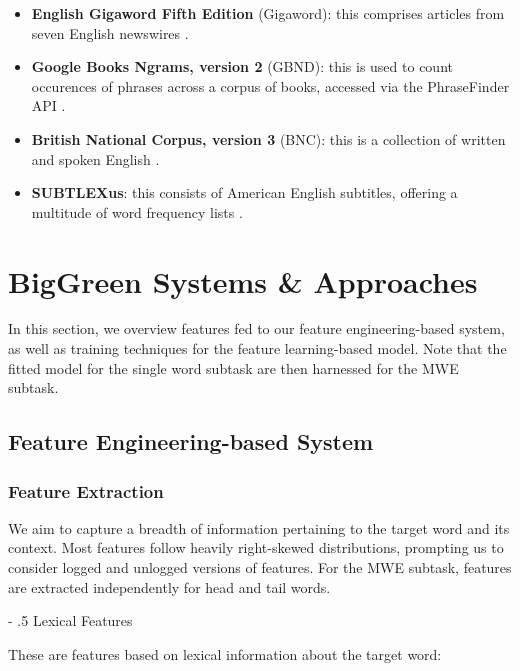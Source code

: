 \documentclass[11pt,a4paper]{article}
\makeatletter
\renewcommand\paragraph{%
    \@startsection{paragraph}{4}{0mm}%
        {-\baselineskip}%
        {.5\baselineskip}%
        {\normalfont\normalsize\bfseries}}
\makeatother
\begin{document}
\begin{itemize}
  \item \noindent \textbf{English Gigaword Fifth Edition} (Gigaword): this comprises articles from seven English newswires \citep{gigaword}.
  \item \noindent \textbf{Google Books Ngrams, version 2} (GBND): this is used to count occurences of phrases across a corpus of books, accessed via the PhraseFinder API \citep{phrasefinder}.
  \item \noindent \textbf{British National Corpus, version 3} (BNC): this is a collection of written and spoken English \citep{BNC}.
  \item \noindent \textbf{SUBTLEXus}: this consists of American English subtitles, offering a multitude of word frequency lists \citep{Brysbaert2009MovingBK}.
\end{itemize}

\section{BigGreen Systems \& Approaches}

In this section, we overview features fed to our feature engineering-based system, as well as training techniques for the feature learning-based model. Note that the fitted model for the single word subtask are then harnessed for the MWE subtask.

\subsection{Feature Engineering-based System}

\subsubsection{Feature Extraction}

We aim to capture a breadth of information pertaining to the target word and its context. Most features follow heavily right-skewed distributions, prompting us to consider logged and unlogged versions of features. For the MWE subtask, features are extracted independently for head and tail words.

\paragraph{Lexical Features}

These are features based on lexical information about the target word:
\end{document}
